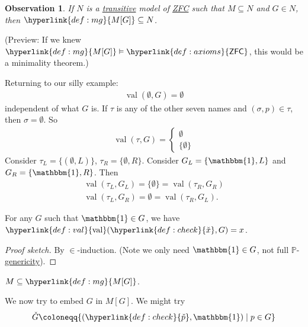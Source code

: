 \documentclass{article}
\newtheorem*{observation}{Observation}
\newcommand{\named}[1]{\textbf{#1}\index{#1}}
\newcommand{\1}{\mathbbm{1}}
\DeclareMathOperator{\val}{val}
\let\models\vDash
\begin{document}
\begin{observation}
  If $N$ is a \hyperlink{def:transitive}{transitive} model of \hyperlink{def:axioms}{\textsf{ZFC}} such that $M \subseteq N$ and $G \in N$, then $\hyperlink{def:mg}{M[G]} \subseteq N$.
\end{observation}

(Preview: If we knew $\hyperlink{def:mg}{M[G]} \models \hyperlink{def:axioms}{\textsf{ZFC}}$, this would be a minimality theorem.)

Returning to our silly example:
\begin{align*}
  \val(\emptyset,G) = \emptyset
\end{align*}
independent of what $G$ is.
If $\tau$ is any of the other seven names and $(\sigma,p) \in \tau$, then $\sigma = \emptyset$.
So
\begin{align*}
  \val(\tau,G) =
  \begin{cases}
    \emptyset \\ \{\emptyset\}
  \end{cases}
\end{align*}
Consider $\tau_L = \{(\emptyset,L)\}$, $\tau_R = \{\emptyset,R\}$.
Consider $G_L = \{\1, L\}$ and $G_R = \{\1,R\}$.
Then
\begin{gather*}
  \val(\tau_L, G_L) = \{\emptyset\} = \val(\tau_R,G_R) \\
  \val(\tau_L, G_R) = \emptyset = \val(\tau_R,G_L).
\end{gather*}
\begin{prop}
  For any $G$ such that $\1 \in G$, we have $\hyperlink{def:val}{\val}(\hyperlink{def:check}{\check{x}},G) = x$.
\end{prop}
\begin{proof}[Proof sketch]
  By $\in$-induction. (Note we only need $\mathbbm{1} \in G$, not full $\mathbb{P}$-\hyperlink{def:dgeneric}{genericity}).
\end{proof}
\begin{cor}
  $M \subseteq \hyperlink{def:mg}{M[G]}$.
\end{cor}
\newlec
We now try to embed $G$ in $M[G]$. We might try
\begin{align*}
  \check{G} \coloneqq \{(\hyperlink{def:check}{\check{p}},\1) \mid p \in G\}
\end{align*}
\end{document}
